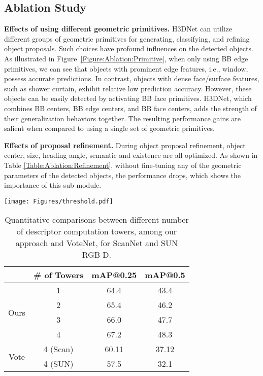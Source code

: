 \subsection{Ablation Study}
\label{Subsection:Ablation:Study}

\noindent\textbf{Effects of using different geometric primitives.} H3DNet can utilize different groups of geometric primitives for generating, classifying, and refining object proposals. Such choices have profound influences on the detected objects. As illustrated in Figure~\ref{Figure:Ablation:Primitive}, when only using BB edge primitives, we can see that objects with prominent edge features, i.e., window, possess accurate predictions. In contrast, objects with dense face/surface features, such as shower curtain, exhibit relative low prediction accuracy. However, these objects can be easily detected by activating BB face primitives. H3DNet, which combines BB centers, BB edge centers, and BB face centers, adds the strength of their generalization behaviors together. The resulting performance gains are salient when compared to using a single set of geometric primitives.  



\noindent\textbf{Effects of proposal refinement.} During object proposal refinement, object center, size, heading angle, semantic and existence are all optimized. As shown in Table \ref{Table:Ablation:Refinement}, without fine-tuning any of the geometric parameters of the detected objects, the performance drops, which shows the importance of this sub-module. 

\begin{table*}[t!]
\begin{minipage}{0.48\textwidth}
  \centering
  \texttt{[image: Figures/threshold.pdf]}
  \label{Figure:Ablation:Threshold}
\end{minipage}
\hfill
\begin{minipage}{0.48\textwidth}
    \caption{Quantitative comparisons between different number of descriptor computation towers, among our approach and VoteNet, for ScanNet and SUN RGB-D.}
    \centering
  \begin{tabular}{c | c | c | c  } 
 \hline
 & \# of Towers  & mAP@0.25 & mAP@0.5 \\
 \hline
 \multirow{4}{2.2em}{Ours} 
  & 1 & 64.4 & 43.4 \\ 
  & 2 & 65.4 & 46.2 \\ 
  & 3 & 66.0 & 47.7 \\ 
  & 4 & 67.2 & 48.3 \\ 
 \hline
 \multirow{2}{2.2em}{Vote} & 4 (Scan) &  60.11 & 37.12 \\ 
 & 4 (SUN) & 57.5 & 32.1 \\
 \hline
 \end{tabular}
\label{Table:Ablation:FeatureExtraction}
\end{minipage}
\end{table*}


